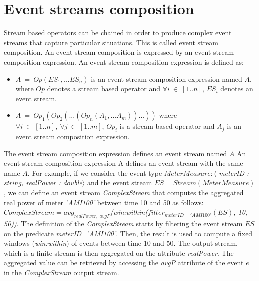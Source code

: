  \section{Event streams composition}
 \label{ch3:sec5}
 Stream based operators can be chained in order to produce complex event streams that capture particular situations.
 This is called event stream composition.
 An event stream composition is expressed by an event stream composition expression.
An event stream composition expression is defined as:
\begin{itemize}
 \item $A\ =\ Op(ES_1,...ES_n)$ is an event stream composition expression named $A$, where $Op$ denotes a stream based operator and $\forall i\ \in\ [1..n]$, $ES_i$ denotes an event stream.
 \item $A\ =\ Op_1(Op_2(...(Op_n(A_1,...A_m))...))$ where $\forall i\ \in\ [1..n],\ \forall j\ \in\ [1..m]$, $Op_i$ is a stream based operator and $A_j$ is an event stream composition expression.
 \end{itemize}
 The event stream composition expression defines an event stream named $A$
 An event stream composition expression A defines an event stream with the same name $A$. 
For example, if we consider the event type $MeterMeasure:\langle$ \textit{meterID : string, realPower : double}$\rangle$ and the event stream $ES=Stream(MeterMeasure)$, we can define an event stream \textit{ComplexStream} that computes the aggregated real power of meter \textit{'AMI100'} between time 10 and 50 as follows:
 \\$ComplexStream=avg_{realPower,\ avgP}$\textit{(win:within(}$filter_{meterID='AMI100'}(ES)$\textit{, 10, 50))}.
 The definition of the \textit{ComplexStream} starts by filtering the event stream $ES$ on the predicate \textit{meterID='AMI100'}. Then, the result is used to compute a fixed windows (\textit{win:within}) of events between time 10 and 50. The output stream, which is a finite stream is then aggregated on the attribute \textit{realPower}. The aggregated value can be retrieved by accessing the \textit{avgP} attribute of the event $e$ in the \textit{ComplexStream} output stream.
